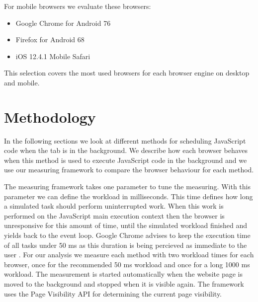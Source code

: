 \documentclass[
	ruledheaders=section,%
	class=report,%
	thesis={type=bachelor},%
	accentcolor=9c,%
	custommargins=true,%
	marginpar=false,%
	parskip=half-,%
	fontsize=11pt,%
]{tudapub}
\begin{document}
  For mobile browsers we evaluate these browsers:

  \begin{itemize}
  \item Google Chrome for Android 76
  \item Firefox for Android 68
  \item iOS 12.4.1 Mobile Safari
  \end{itemize}

  This selection covers the most used browsers for each browser engine on desktop and mobile.

  \section{Methodology}

  In the following sections we look at different methods for scheduling JavaScript code when the tab is in the background. We describe how each browser behaves when this method is used to execute JavaScript code in the background and we use our measuring framework to compare the browser behaviour for each method.

  The measuring framework takes one parameter to tune the measuring. With this parameter we can define the workload in milliseconds. This time defines how long a simulated task should perform uninterrupted work. When this work is performed on the JavaScript main execution context then the browser is unresponsive for this amount of time, until the simulated workload finished and yields back to the event loop. Google Chrome advises to keep the execution time of all tasks under 50 ms as this duration is being percieved as immediate to the user \cite{chrome-rail-model}. For our analysis we measure each method with two workload times for each browser, once for the recommended 50 ms workload and once for a long 1000 ms workload. The measurement is started automatically when the website page is moved to the background and stopped when it is visible again. The framework uses the Page Visibility API \cite{mdn-page-visibility} for determining the current page visibility.
\end{document}
